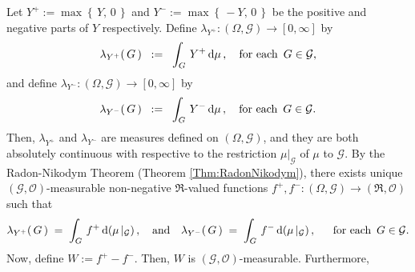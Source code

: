\proof
Let $Y^{+} := \max\left\{\,Y,\,0\,\right\}$ and $Y^{-} := \max\left\{\,-Y,\,0\,\right\}$
be the positive and negative parts of $Y$ respectively.
Define $\lambda_{Y^{+}} : (\Omega,\mathcal{G}) \longrightarrow [0,\infty]$ by
\begin{equation*}
\lambda_{Y^{+}}(\,G\,) \;\; := \;\; \int_{G}\, Y^{+} \,\textnormal{d}\mu\,,
\quad
\textnormal{for each \,$G \in \mathcal{G}$},
\end{equation*}
and define $\lambda_{Y^{-}} : (\Omega,\mathcal{G}) \longrightarrow [0,\infty]$ by
\begin{equation*}
\lambda_{Y^{-}}(\,G\,) \;\; := \;\; \int_{G}\, Y^{-} \,\textnormal{d}\mu\,,
\quad
\textnormal{for each \,$G \in \mathcal{G}$}.
\end{equation*}
Then, $\lambda_{Y^{+}}$ and $\lambda_{Y^{-}}$ are measures defined on
$(\Omega,\mathcal{G})$, and they are both absolutely continuous with respective
to the restriction $\mu\vert_{\mathcal{G}}$ of $\mu$ to $\mathcal{G}$.
By the Radon-Nikodym Theorem (Theorem \ref{Thm:RadonNikodym}),
there exists unique $(\mathcal{G},\mathcal{O})$-measurable non-negative
$\Re$-valued functions
$f^{+}, f^{-} : (\Omega,\mathcal{G}) \longrightarrow (\Re,\mathcal{O})$
such that
\begin{equation*}
\lambda_{Y^{+}}(\,G\,) \;=\; \int_{G}\,f^{+}\,\textnormal{d}(\mu\,\vert_{\mathcal{G}})\,,
\quad\textnormal{and}\quad
\lambda_{Y^{-}}(\,G\,) \;=\; \int_{G}\,f^{-}\,\textnormal{d}(\mu\,\vert_{\mathcal{G}})\,,
\quad\;\;
\textnormal{for each \,$G \in \mathcal{G}$}.
\end{equation*}
Now, define $W := f^{+} - f^{-}$.
Then, $W$ is $(\mathcal{G},\mathcal{O})$-measurable.
Furthermore,
